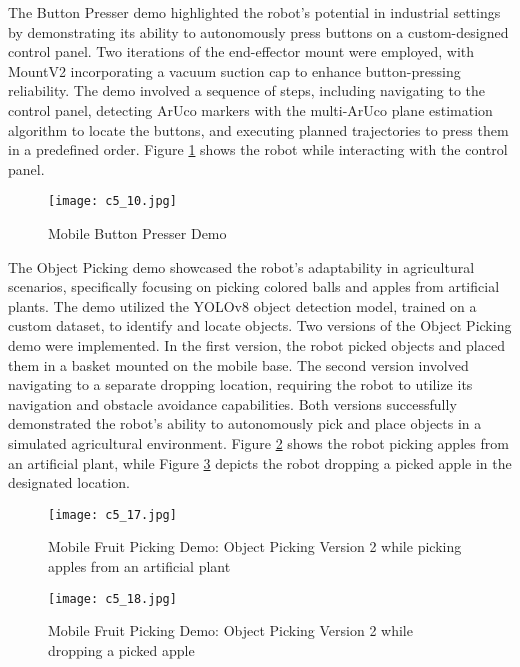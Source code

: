The Button Presser demo highlighted the robot's potential in industrial settings by demonstrating its ability 
to autonomously press buttons on a custom-designed control panel. Two iterations of the end-effector mount were employed,
with MountV2 incorporating a vacuum suction cap to enhance button-pressing reliability. The demo involved a 
sequence of steps, including navigating to the control panel, detecting ArUco markers with the 
multi-ArUco plane estimation algorithm to locate the buttons, 
and executing planned trajectories to press them in a predefined order. Figure \ref{fig:buttonpresser} shows the robot
while interacting with the control panel.

\begin{figure}[H]
    \centering
    \texttt{[image: c5\_10.jpg]}
    \caption{Mobile Button Presser Demo}
    \label{fig:buttonpresser}
\end{figure}

The Object Picking demo showcased the robot's adaptability in agricultural scenarios, specifically focusing 
on picking colored balls and apples from artificial plants. The demo utilized the YOLOv8 object detection model,
trained on a custom dataset, to identify and locate objects.
Two versions of the Object Picking demo were implemented. In the first version, the robot picked objects and 
placed them in a basket mounted on the mobile base. The second version involved navigating to a separate dropping 
location, requiring the robot to utilize its navigation and obstacle avoidance capabilities. Both versions 
successfully demonstrated the robot's ability to autonomously pick and place objects in a simulated agricultural 
environment. Figure \ref{fig:demo2_1} shows the robot picking apples from an artificial plant, 
while Figure \ref{fig:demo2_2} depicts the robot dropping a picked apple in the designated location.

\begin{figure}[H]
    \centering
    \texttt{[image: c5\_17.jpg]}
    \caption{Mobile Fruit Picking Demo: Object Picking Version 2 while picking apples from an artificial plant}
    \label{fig:demo2_1}
\end{figure}

\begin{figure}[H]
    \centering
    \texttt{[image: c5\_18.jpg]}
    \caption{Mobile Fruit Picking Demo: Object Picking Version 2 while dropping a picked apple}
    \label{fig:demo2_2}
\end{figure}

